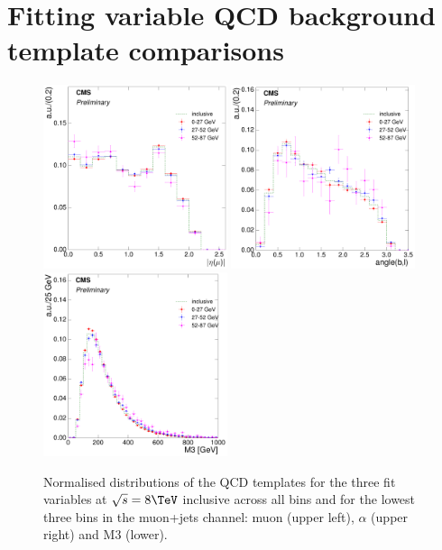 \clearpage


\section{Fitting variable QCD background template comparisons}
\label{as:fitting_variable_QCD_template_comparisons}

\begin{figure}[hbtp]
    \centering
     \includegraphics[width=0.48\textwidth]{Chapters/04_Analysis/04b_XSections/images/8TeV/fit_variables/muon/MET/muon_absolute_eta/qcd/MET_muon_absolute_eta_0orMoreBtag_QCD_template_comparison.pdf}\hfill
     \includegraphics[width=0.48\textwidth]{Chapters/04_Analysis/04b_XSections/images/8TeV/fit_variables/muon/MET/angle_bl/qcd/MET_angle_bl_1orMoreBtag_QCD_template_comparison.pdf}\\
     \includegraphics[width=0.48\textwidth]{Chapters/04_Analysis/04b_XSections/images/8TeV/fit_variables/muon/MET/M3/qcd/MET_M3_0orMoreBtag_QCD_template_comparison.pdf}\\
	 \caption{Normalised distributions of the QCD templates for the three fit variables at $\sqrt{s}=8\TeV$
	 inclusive across all \met bins and for the lowest three \met bins in the muon+jets channel: muon
	 \abseta (upper left), $\alpha$ (upper right) and M3 (lower).}
     \label{fig:MET_fit_variable_qcd_comparisons_muon_8TeV}
\end{figure}

